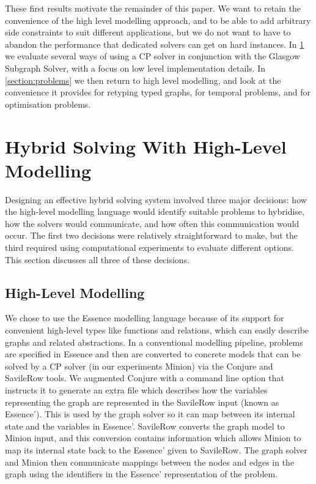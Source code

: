 \documentclass[runningheads]{llncs}
\begin{document}
These first results motivate the remainder of this paper. We want to retain the convenience of the
high level modelling approach, and to be able to add arbitrary side constraints to suit different
applications, but we do not want to have to abandon the performance that dedicated solvers can get
on hard instances. In \cref{section:hybrid} we evaluate several ways of using a CP solver in
conjunction with the Glasgow Subgraph Solver, with a focus on low level implementation details. In
\cref{section:problems} we then return to high level modelling, and look at the convenience it
provides for retyping typed graphs, for temporal problems, and for optimisation problems.

\section{Hybrid Solving With High-Level Modelling}\label{section:hybrid}

Designing an effective hybrid solving system involved three major decisions: how the high-level
modelling language would identify suitable problems to hybridise, how the solvers would communicate,
and how often this communication would occur. The first two decisions were relatively
straightforward to make, but the third required using computational experiments to evaluate
different options. This section discusses all three of these decisions.

\subsection{High-Level Modelling}

We chose to use the Essence modelling language \cite{DBLP:journals/constraints/FrischHJHM08} because
of its support for convenient high-level types like functions and relations, which can easily
describe graphs and related abstractions. In a conventional modelling pipeline, problems are
specified in Essence and then are converted to concrete models that can be solved by a CP solver (in
our experiments Minion) via the Conjure and SavileRow tools. We augmented Conjure with a command
line option that instructs it to generate an extra file which describes how the variables
representing the graph are represented in the SavileRow input (known as Essence'). This is used by
the graph solver so it can map between its internal state and the variables in Essence'.  SavileRow
converts the graph model to Minion input, and this conversion contains information which allows
Minion to map its internal state back to the Essence' given to SavileRow. The graph solver and
Minion then communicate mappings between the nodes and edges in the graph using the identifiers in
the Essence' representation of the problem.
\end{document}
